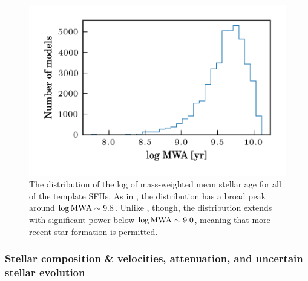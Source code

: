 \begin{figure}
    \centering
    \includegraphics[width=\columnwidth]{MWA_dist}
    \caption[Distribution of the log mass-weighted mean stellar age for training data]{\fixspacing The distribution of the log of mass-weighted mean stellar age for all of the template SFHs. As in \citet{gallazzi_brinchmann_08}, the distribution has a broad peak around $\log {\rm MWA} \sim 9.8$. Unlike \citet{gallazzi_brinchmann_08}, though, the distribution extends with significant power below $\log {\rm MWA} \sim 9.0$, meaning that more recent star-formation is permitted.}
    \label{fig:mwa_dist}
\end{figure}

\subsubsection{Stellar composition \& velocities, attenuation, and uncertain stellar evolution}

